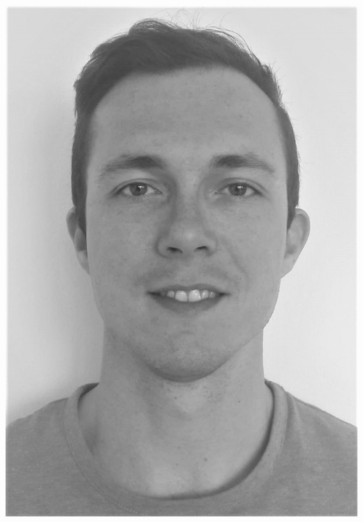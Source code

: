 \documentclass[10pt,A4]{article}
\newcommand{\spread}{7pt}
\begin{document}
\pagestyle{fancy}

\begin{minipage}[t]{0.485\textwidth}

\vspace{\spread}


\hspace{0.0\linewidth}\colorbox{bgcol}
{
	}
\bigbreak
\bigbreak


\hspace{5.87cm}\includegraphics[scale=0.13]{img/PhotoProfil.jpeg} %


\end{minipage}
\end{document}
